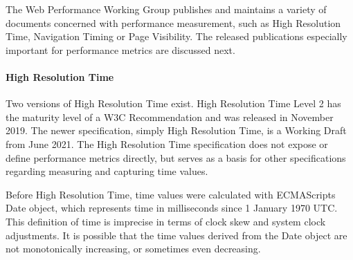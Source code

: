 
The Web Performance Working Group publishes and maintains a variety of documents concerned with performance measurement, such as High Resolution Time, Navigation Timing or Page Visibility. %
The released publications especially important for performance metrics are discussed next.















\paragraph{High Resolution Time}

Two versions of High Resolution Time exist.
High Resolution Time Level 2 has the maturity level of a W3C Recommendation and was released in November 2019. %
The newer specification, simply High Resolution Time,  is a Working Draft from June 2021.%
The High Resolution Time specification does not expose or define performance metrics directly, but serves as a basis for other specifications regarding measuring and capturing time values.



Before High Resolution Time, time values were calculated with ECMAScripts Date object, which represents time in milliseconds since 1 January 1970 UTC. %
This definition of time is imprecise in terms of clock skew and system clock adjustments.
It is possible that the time values derived from the Date object are not monotonically increasing, or sometimes even decreasing.

